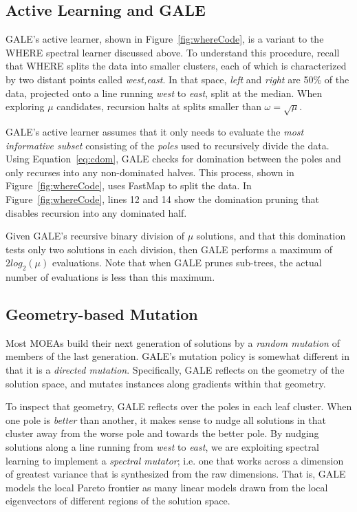 \documentclass[10pt,journal,compsoc]{IEEEtran}
\newcommand{\eq}[1]{Equation~\ref{eq:#1}}
\newcommand{\fig}[1]{Figure~\ref{fig:#1}}
\begin{document}




\subsection{Active Learning and GALE}\label{sec:al}
GALE's active learner, shown in \fig{whereCode}, is a variant to the WHERE spectral learner discussed above.
To understand this procedure, recall that WHERE splits the data into smaller clusters, each of which is characterized by two distant points called {\em west,east}. 
In that space, {\em left} and {\em right} are  50\% of the data, projected onto a line running {\em west} to {\em east}, split at the median.
When exploring $\mu$ candidates, recursion halts at splits smaller than $\omega=\sqrt{\mu}$.

GALE's active learner assumes that it only needs to evaluate
the {\em most informative subset} consisting of the {\em poles} used to
recursively divide the data. 
Using \eq{cdom}, GALE checks for domination between the poles and only recurses into any non-dominated halves.
This process, shown in \fig{whereCode}, uses FastMap to split the data. 
In  \fig{whereCode}, lines 12 and 14 show the domination pruning that disables recursion into any dominated half.


Given GALE's recursive binary division of $\mu$ solutions, and that this domination tests only two solutions in each division, then GALE performs  a maximum of $2log_2(\mu)$ evaluations. 
Note that when GALE prunes sub-trees, the actual number of evaluations is less than this maximum.


\subsection{Geometry-based Mutation}\label{sec:geom}
Most MOEAs build their next generation of solutions by a {\em random mutation} of members of the last generation. 
GALE's mutation policy is somewhat different in that it is a {\em directed mutation}.
Specifically, GALE reflects on the geometry of the solution space, and mutates instances along gradients within that geometry. 

To inspect that geometry, GALE reflects over the poles in each leaf cluster. 
When one pole is {\em better} than another, it makes sense to nudge all solutions in that cluster away from the worse pole and towards the better pole.
By nudging solutions along a line running from {\em west} to {\em east}, we are exploiting spectral learning to implement a {\em spectral mutator}; i.e. one that works across a dimension of greatest variance that is synthesized from the raw dimensions.  
That is, GALE models the local Pareto frontier as many linear models
drawn from the local eigenvectors of different
regions of the solution space. 
 
\end{document}
